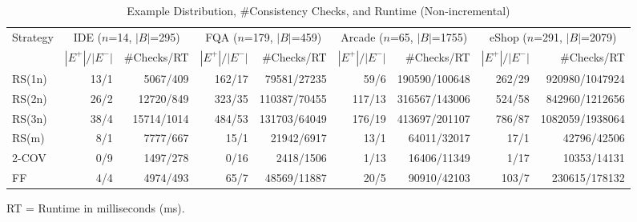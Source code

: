 \usepackage{booktabs}
\usepackage{multirow}


\begin{table}[htbp]
\centering
\caption{Example Distribution, \#Consistency Checks, and Runtime (Non-incremental)}
\label{tab:table7}
\begin{tabular}{l|rr|rr|rr|rr}
\toprule
\multirow{2}{*}{Strategy}
    & \multicolumn{2}{c|}{IDE ($n$=14, $|B|$=295)}
    & \multicolumn{2}{c|}{FQA ($n$=179, $|B|$=459)}
    & \multicolumn{2}{c|}{Arcade ($n$=65, $|B|$=1755)}
    & \multicolumn{2}{c}{eShop ($n$=291, $|B|$=2079)} \\
    & $|E^+|/|E^-|$ & \#Checks/RT
    & $|E^+|/|E^-|$ & \#Checks/RT
    & $|E^+|/|E^-|$ & \#Checks/RT
    & $|E^+|/|E^-|$ & \#Checks/RT \\
\midrule
RS(1n) & 13/1  & 5067/409     & 162/17 & 79581/27235   & 59/6   & 190590/100648  & 262/29 & 920980/1047924 \\
RS(2n) & 26/2  & 12720/849    & 323/35 & 110387/70455  & 117/13 & 316567/143006  & 524/58 & 842960/1212656 \\
RS(3n) & 38/4  & 15714/1014   & 484/53 & 131703/64049  & 176/19 & 413697/201107  & 786/87 & 1082059/1938064 \\
RS(m)  & 8/1   & 7777/667     & 15/1   & 21942/6917    & 13/1   & 64011/32017    & 17/1   & 42796/42506 \\
2-COV  & 0/9   & 1497/278     & 0/16   & 2418/1506     & 1/13   & 16406/11349    & 1/17   & 10353/14131 \\
FF     & 4/4   & 4974/493     & 65/7   & 48569/11887   & 20/5   & 90910/42103    & 103/7  & 230615/178132 \\
\bottomrule
\end{tabular}
\begin{flushleft}
\small RT = Runtime in milliseconds (ms).
\end{flushleft}
\end{table}


